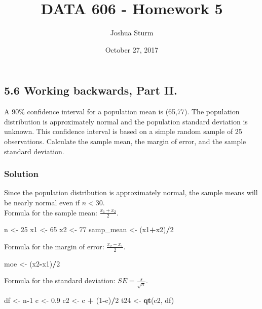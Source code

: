 \documentclass[]{article}
\title{DATA 606 - Homework 5}
\author{Joshua Sturm}
\date{October 27, 2017}
\newenvironment{Shaded}{\begin{snugshade}}{\end{snugshade}}
\newcommand{\KeywordTok}[1]{\textcolor[rgb]{0.13,0.29,0.53}{\textbf{#1}}}
\newcommand{\DecValTok}[1]{\textcolor[rgb]{0.00,0.00,0.81}{#1}}
\newcommand{\FloatTok}[1]{\textcolor[rgb]{0.00,0.00,0.81}{#1}}
\newcommand{\StringTok}[1]{\textcolor[rgb]{0.31,0.60,0.02}{#1}}
\newcommand{\OperatorTok}[1]{\textcolor[rgb]{0.81,0.36,0.00}{\textbf{#1}}}
\newcommand{\NormalTok}[1]{#1}
\begin{document}
\maketitle

\subsection{5.6 Working backwards, Part
II.}\label{working-backwards-part-ii.}

A 90\% confidence interval for a population mean is (65,77). The
population distribution is approximately normal and the population
standard deviation is unknown. This confidence interval is based on a
simple random sample of 25 observations. Calculate the sample mean, the
margin of error, and the sample standard deviation.

\subsubsection{Solution}\label{solution}

Since the population distribution is approximately normal, the sample
means will be nearly normal even if \(n < 30\).\\
Formula for the sample mean: \(\frac{x_1 + x_2}{2}\).

\begin{Shaded}
\begin{Highlighting}[]
\NormalTok{n <-}\StringTok{ }\DecValTok{25}
\NormalTok{x1 <-}\StringTok{ }\DecValTok{65}
\NormalTok{x2 <-}\StringTok{ }\DecValTok{77}
\NormalTok{samp_mean <-}\StringTok{ }\NormalTok{(x1}\OperatorTok{+}\NormalTok{x2)}\OperatorTok{/}\DecValTok{2}
\end{Highlighting}
\end{Shaded}

Formula for the margin of error: \(\frac{x_2 - x_1}{2}\).

\begin{Shaded}
\begin{Highlighting}[]
\NormalTok{moe <-}\StringTok{ }\NormalTok{(x2}\OperatorTok{-}\NormalTok{x1)}\OperatorTok{/}\DecValTok{2}
\end{Highlighting}
\end{Shaded}

Formula for the standard deviation: \(SE = \frac{s}{\sqrt{n}}\).\\

\begin{Shaded}
\begin{Highlighting}[]
\NormalTok{df <-}\StringTok{ }\NormalTok{n}\OperatorTok{-}\DecValTok{1}
\NormalTok{c <-}\StringTok{ }\FloatTok{0.9}
\NormalTok{c2 <-}\StringTok{ }\NormalTok{c }\OperatorTok{+}\StringTok{ }\NormalTok{(}\DecValTok{1}\OperatorTok{-}\NormalTok{c)}\OperatorTok{/}\DecValTok{2}
\NormalTok{t24 <-}\StringTok{ }\KeywordTok{qt}\NormalTok{(c2, df)}
\end{Highlighting}
\end{Shaded}
\end{document}
